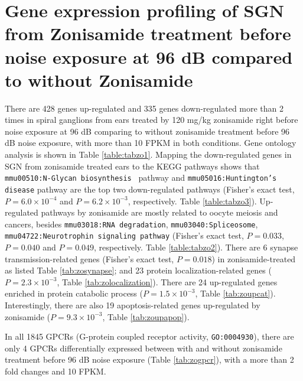 \documentclass{article}
\begin{document}
\section{Gene expression profiling of SGN from Zonisamide treatment before noise exposure at 96 dB compared to without Zonisamide}
There are 428 genes up-regulated and 335 genes down-regulated more than 2 times in spiral ganglions from ears treated by 120 mg/kg zonisamide right before noise exposure at 96 dB comparing to without zonisamide treatment before 96 dB noise exposure, with more than 10 FPKM in both conditions. Gene ontology analysis is shown in Table \ref{table:tabzo1}. Mapping the down-regulated genes in SGN from zonisamide treated ears to the KEGG pathways shows that \texttt{mmu00510:N-Glycan biosynthesis
} pathway and \texttt{mmu05016:Huntington's disease} pathway are the top two down-regulated pathways (Fisher's exact test, $P=6.0\times 10^{-4}$ and $P=6.2\times 10^{-3}$, respectively. Table \ref{table:tabzo3}). Up-regulated pathways by zonisamide are mostly related to oocyte meiosis and cancers, besides \texttt{mmu03018:RNA degradation}, \texttt{mmu03040:Spliceosome}, \texttt{mmu04722:Neurotrophin signaling pathway} (Fisher's exact test, $P=0.033$, $P=0.040$ and $P=0.049$, respectively. Table \ref{table:tabzo2}). There are 6 synapse transmission-related genes (Fisher's exact test, $P=0.018$) in zonisamide-treated as listed Table \ref{tab:zosynapse}; and 23 protein localization-related genes ($P=2.3\times 10^{-3}$, Table \ref{tab:zolocalization}). There are 24 up-regulated genes enriched in protein catabolic process ($P=1.5\times 10^{-3}$, Table \ref{tab:zoupcat}). Interestingly, there are also 19 apoptosis-related genes up-regulated by zonisamide ($P=9.3\times 10^{-3}$, Table \ref{tab:zoupapop}).

In all 1845 GPCRs (G-protein coupled receptor activity, \texttt{GO:0004930}), there are only 4 GPCRs differentially expressed between with and without zonisamide treatment before 96 dB noise exposure (Table \ref{tab:zogpcr}), with a more than 2 fold changes and 10 FPKM.
\end{document}
